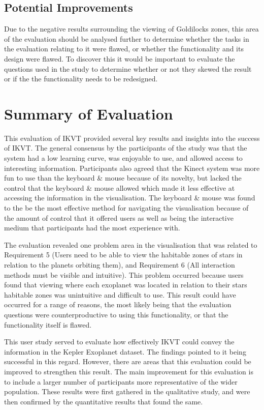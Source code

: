 \subsection{Potential Improvements}
Due to the negative results surrounding the viewing of Goldilocks zones,
this area of the evaluation should be analysed further to determine whether the
tasks in the evaluation relating to it were flawed, or whether the functionality
and its design were flawed. To discover this it would be important to evaluate
the questions used in the study to determine whether or not they skewed the
result or if the the functionality needs to be
redesigned. 


\section{Summary of Evaluation}
This evaluation of IKVT provided several key results and insights into the
success of IKVT. The general consensus by the participants of the study
was that the system had a low learning curve, was enjoyable to use, and allowed
access to interesting information. Participants also agreed that the Kinect
system was more fun to use than the keyboard \&
mouse because of its novelty, but lacked the control that the
keyboard \& mouse allowed which made it less effective at accessing the
information in the visualisation. The keyboard \& mouse was found to the be the
most effective method for navigating the visualisation because of the amount of
control that it offered users as well as being the interactive medium that
participants had the most experience with.

The evaluation revealed one problem area in the visualisation that was related
to Requirement 5 (Users need to be able to view the habitable zones of stars in
relation to the planets orbiting them), and Requirement 6 (All interaction
methods must be visible and intuitive). This problem occurred because users
found that
viewing where each exoplanet was located in relation to their stars habitable
zones was unintuitive and difficult to use. This result could have occurred for
a
range of reasons, the most likely being that the evaluation questions were
counterproductive to using this functionality, or that the functionality itself
is flawed.

This user study served to evaluate how effectively IKVT could convey the
information in the Kepler Exoplanet dataset. The findings pointed to it
being successful in this regard. However, there are areas that this evaluation
could be improved to strengthen this result. The main improvement for this
evaluation is to include a larger number of participants more representative of
the wider population. These results were first gathered in the qualitative
study, and were then confirmed by the quantitative results that found the same.



